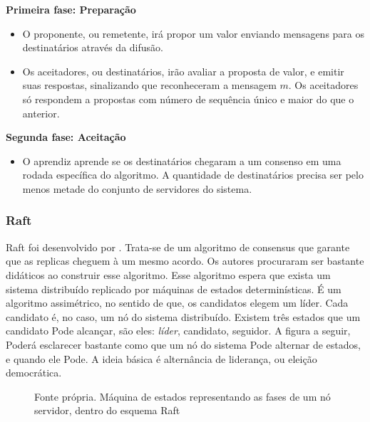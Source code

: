 \textbf{Primeira fase: Preparação}

\begin{itemize}

\item O proponente, ou remetente, irá propor um valor enviando mensagens para os destinatários através da difusão.

\item Os aceitadores, ou destinatários, irão avaliar a proposta de valor, e emitir suas respostas, sinalizando que reconheceram a mensagem $m$. Os aceitadores só respondem a propostas com número de sequência único e maior do que o anterior.
\end{itemize}

\textbf{Segunda fase: Aceitação}

\begin{itemize}
\item O aprendiz aprende se os destinatários chegaram a um consenso em uma rodada específica do algoritmo. A quantidade de destinatários precisa ser pelo menos metade do conjunto de servidores do sistema.
\end{itemize}

\subsubsection{Raft}

Raft foi desenvolvido por \cite{raft}. Trata-se de um algoritmo de consensus que garante que as replicas cheguem à um mesmo acordo. Os autores procuraram ser bastante didáticos ao construir esse algoritmo. Esse algoritmo espera que exista um sistema distribuído replicado por máquinas de estados determinísticas. É um algoritmo assimétrico, no sentido de que, os candidatos elegem um líder. Cada candidato é, no caso, um nó do sistema distribuído. Existem três estados que um candidato Pode alcançar, são eles: \textit{líder}, candidato, seguidor. A figura a seguir, Poderá esclarecer bastante como que um nó do sistema Pode alternar de estados, e quando ele Pode. A ideia básica é alternância de liderança, ou eleição democrática.

\begin{figure}[h] %
\centering
{}
\caption{Fonte própria. Máquina de estados representando as fases de um nó servidor, dentro do esquema Raft}
\end{figure}

